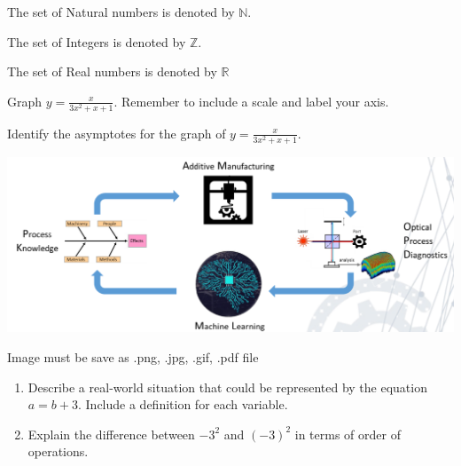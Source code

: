 \documentclass[11pt]{article}
\def\eq1{y =\frac{x}{3x^2+x+1}}
\def\labelaxes{Remember to include a scale and label your axis.}
\begin{document}
The set of Natural numbers is denoted by $\mathbb{N}$.

The set of Integers is denoted by $\mathbb{Z}$.

The set of Real numbers is denoted by $\mathbb{R}$

Graph $\eq1$. \labelaxes

Identify the asymptotes for the graph of $\eq1$.

\begin{center}
\includegraphics[scale=0.2]{DA.png}

Image must be save as .png, .jpg, .gif, .pdf file
\end{center}

\begin{enumerate}
\item Describe a real-world situation that could be represented by the equation $a=b+3$. Include a definition for each variable.
\item Explain the difference between $-3^2$ and $(-3)^2$ in terms of order of operations.

\end{enumerate}
\end{document}
